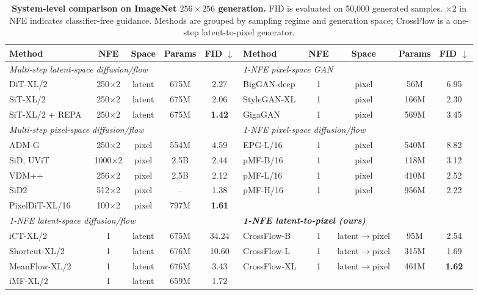 \begin{table}[t]
\centering
\caption{\textbf{System-level comparison on ImageNet $256\times256$ generation.} FID is evaluated on 50,000 generated samples. $\times 2$ in NFE indicates classifier-free guidance. Methods are grouped by sampling regime and generation space; CrossFlow is a one-step latent-to-pixel generator.}
\vspace{0.5em}
\scriptsize
\setlength{\tabcolsep}{4.5pt}
\begin{tabular}{l | cc | c | c| l | cc |c |c}
\toprule
\textbf{Method} & NFE & Space & Params & FID $\downarrow$ & \textbf{Method} & NFE & Space & Params & FID $\downarrow$\\
\midrule
\multicolumn{5}{l|}{\textit{Multi-step latent-space diffusion/flow}} & \multicolumn{5}{l}{\textit{1-NFE pixel-space GAN}}\\
\quad DiT-XL/2~\citep{dit} & 250$\times$2 & latent & 675M & 2.27 & \quad BigGAN-deep~\citep{biggan} & 1 & pixel & 56M & 6.95\\
\quad SiT-XL/2~\citep{sit} & 250$\times$2 & latent & 675M & 2.06 & \quad StyleGAN-XL~\citep{stylegan} & 1 & pixel & 166M & 2.30 \\
\quad SiT-XL/2 + REPA~\citep{repa} & 250$\times$2 & latent & 675M & \textbf{1.42} & \quad GigaGAN~\citep{gigagan} & 1 & pixel & 569M & 3.45\\
\midrule
\multicolumn{5}{l|}{\textit{Multi-step pixel-space diffusion/flow}} & \multicolumn{5}{l}{\textit{1-NFE pixel-space diffusion/flow}}\\
\quad ADM-G~\citep{adm} & 250$\times$2 & pixel & 554M & 4.59 & \quad EPG-L/16~\citep{epg} & 1 & pixel & 540M & 8.82 \\
\quad SiD, UViT~\citep{sid} & 1000$\times$2 & pixel & 2.5B & 2.44 & \quad pMF-B/16~\citep{pmf} & 1 & pixel & 118M & 3.12\\
\quad VDM++~\citep{vdmpp} & 256$\times$2 & pixel & 2.5B & 2.12 & \quad pMF-L/16~\citep{pmf} & 1 & pixel & 410M & 2.52\\
\quad SiD2~\citep{sid2} & 512$\times$2 & pixel & -- & 1.38 & \quad pMF-H/16~\citep{pmf} & 1 & pixel & 956M & 2.22 \\
\quad PixelDiT-XL/16~\citep{pixeldit} & 100$\times$2 & pixel & 797M & \textbf{1.61} \\
\midrule
\multicolumn{5}{l|}{\textit{1-NFE latent-space diffusion/flow}} & \multicolumn{5}{l}{\textbf{\textit{1-NFE latent-to-pixel (ours)}}} \\
\quad iCT-XL/2~\citep{ICT} & 1 & latent & 675M  & 34.24 & \quad CrossFlow-B & 1 & latent$\to$pixel & 95M & 2.54 \\
\quad Shortcut-XL/2~\citep{shortcut} & 1 & latent & 676M & 10.60 & \quad CrossFlow-L & 1 & latent$\to$pixel & 315M & 1.69 \\
\quad MeanFlow-XL/2~\citep{meanflow} & 1 & latent & 676M & 3.43 & \quad CrossFlow-XL & 1 & latent$\to$pixel & 461M & \textbf{1.62}\\
\quad iMF-XL/2~\citep{imf} & 1 & latent & 659M & 1.72 \\
\bottomrule
\end{tabular}
\label{tab:main_results}
\end{table}
